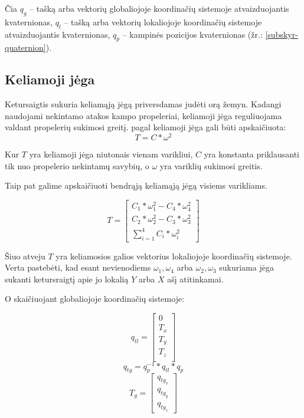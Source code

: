 \documentclass[12pt, a4paper, lithuanian, final]{article}
\begin{document}
Čia $q_{g}$ -- tašką arba vektorių globaliojoje koordinačių sistemoje atvaizduojantis kvaternionas, $q_{l}$ -- tašką arba vektorių lokaliojoje koordinačių sistemoje atvaizduojantis kvaternionas, $q_{p}$ -- kampinės pozicijos kvaternionas (žr.: \ref{subskyr-quaternion}).





\subsection{Keliamoji jėga}

Ketursaigtis sukuria keliamąją jėgą priversdamas judėti orą žemyn.
Kadangi naudojami nekintamo atakos kampo propeleriai, keliamoji jėga reguliuojama valdant propelerių sukimosi greitį.
pagal \cite{gibiansky2010quadcopter,magnussen2011modeling} keliamoji jėga gali būti apskaičiuota:
\begin{equation}
	T = C * \omega^2
\end{equation}

Kur $T$ yra keliamoji jėga niutonais vienam varikliui, $C$ yra konstanta priklausanti tik nuo propelerio nekintamų savybių, o $\omega$ yra variklių sukimosi greitis.

Taip pat galime apskaičiuoti bendrąją keliamąją jėgą visiems varikliams.

\begin{equation}
	T = \left[
		\begin{array}{c}
			C_{1} * \omega_{1}^2 - C_{4} * \omega_{4}^2 \\
			C_{2} * \omega_{2}^2 - C_{3} * \omega_{3}^2\\
			\displaystyle\sum_{i=1}^{4} C_i * \omega_i^2
		\end{array}
	\right]
\end{equation}

Šiuo atveju $T$ yra keliamosios galios vektorius lokaliojoje koordinačių sistemoje.
Verta pastebėti, kad esant nevienodiems $\omega_{1}, \omega_{4}$ arba $\omega_{2}, \omega_{3}$ sukuriama jėga sukanti ketursraigtį apie jo lokalią $Y$ arba $X$ ašį atitinkamai.

O skaičiuojant globaliojoje koordinačių sistemoje:

\begin{equation}
q_{tl} = \left[
		\begin{array}{c}
			0\\
			T_x\\
			T_y\\
			T_z\\
		\end{array}
		\right]
\end{equation}
\begin{equation}
	q_{tg} = q_{p}^{-1} * q_{tl} * q_{p}
\end{equation}
\begin{equation}
	T_g = \left[
		\begin{array}{c}
			q_{tg_x} \\
			q_{tg_y} \\
			q_{tg_z}
		\end{array}
	\right]
\end{equation}
\end{document}
